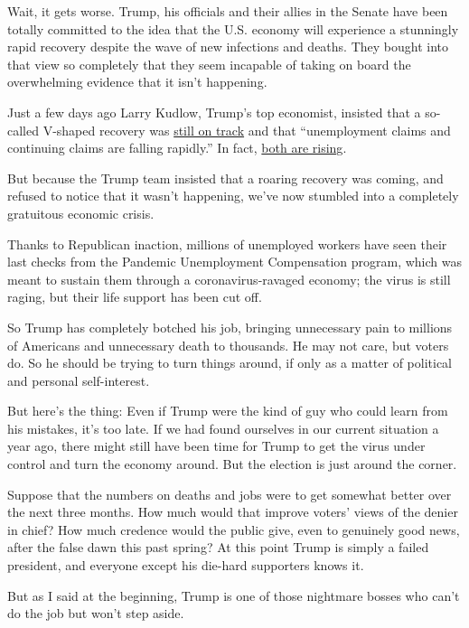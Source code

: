 Wait, it gets worse. Trump, his officials and their allies in the Senate
have been totally committed to the idea that the U.S. economy will
experience a stunningly rapid recovery despite the wave of new
infections and deaths. They bought into that view so completely that
they seem incapable of taking on board the overwhelming evidence that it
isn't happening.

Just a few days ago Larry Kudlow, Trump's top economist, insisted that a
so-called V-shaped recovery was
\href{https://www.foxbusiness.com/economy/kudlow-maintains-v-shaped-economic-recovery-still-intact-despite-coronavirus-resurgence}{still
on track} and that ``unemployment claims and continuing claims are
falling rapidly.'' In fact,
\href{https://fred.stlouisfed.org/graph/fredgraph.png?g=tzhR}{both are
rising}.

But because the Trump team insisted that a roaring recovery was coming,
and refused to notice that it wasn't happening, we've now stumbled into
a completely gratuitous economic crisis.

Thanks to Republican inaction, millions of unemployed workers have seen
their last checks from the Pandemic Unemployment Compensation program,
which was meant to sustain them through a coronavirus-ravaged economy;
the virus is still raging, but their life support has been cut off.

So Trump has completely botched his job, bringing unnecessary pain to
millions of Americans and unnecessary death to thousands. He may not
care, but voters do. So he should be trying to turn things around, if
only as a matter of political and personal self-interest.

But here's the thing: Even if Trump were the kind of guy who could learn
from his mistakes, it's too late. If we had found ourselves in our
current situation a year ago, there might still have been time for Trump
to get the virus under control and turn the economy around. But the
election is just around the corner.

Suppose that the numbers on deaths and jobs were to get somewhat better
over the next three months. How much would that improve voters' views of
the denier in chief? How much credence would the public give, even to
genuinely good news, after the false dawn this past spring? At this
point Trump is simply a failed president, and everyone except his
die-hard supporters knows it.

But as I said at the beginning, Trump is one of those nightmare bosses
who can't do the job but won't step aside.

